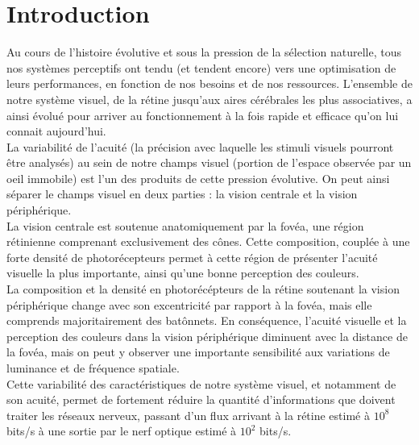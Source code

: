 
\chapter{Introduction} %
\label{Introduction} %


\newcommand{\keyword}[1]{\textbf{#1}}
\newcommand{\tabhead}[1]{\textbf{#1}}
\newcommand{\code}[1]{\texttt{#1}}
\newcommand{\file}[1]{\texttt{\bfseries#1}}
\newcommand{\option}[1]{\texttt{\itshape#1}}


Au cours de l'histoire évolutive et sous la pression de la sélection naturelle, tous nos systèmes perceptifs ont tendu (et tendent encore) vers une optimisation de leurs performances, en fonction de nos besoins et de nos ressources.
L'ensemble de notre système visuel, de la rétine jusqu'aux aires cérébrales les plus associatives, a ainsi évolué pour arriver au fonctionnement à la fois rapide et efficace qu'on lui connait aujourd'hui. \autocite{Werner2014}\\

La variabilité de l'acuité (la précision avec laquelle les stimuli visuels pourront être analysés) au sein de notre champs visuel (portion de l'espace observée par un oeil immobile) est l'un des produits de cette pression évolutive. On peut ainsi séparer le champs visuel en deux parties : la vision centrale et la vision périphérique.\autocite{Werner2014} \\
La vision centrale est soutenue anatomiquement par la fovéa, une région rétinienne comprenant exclusivement des cônes. Cette composition, couplée à une forte densité de photorécepteurs permet à cette région de présenter l'acuité visuelle la plus importante, ainsi qu'une bonne perception des couleurs. \autocite{Werner2014}\\
La composition et la densité en photorécépteurs de la rétine soutenant la vision périphérique change avec son excentricité par rapport à la fovéa, mais elle comprends majoritairement des batônnets. En conséquence, l'acuité visuelle et la perception des couleurs dans la vision périphérique diminuent avec la distance de la fovéa, mais on peut y observer une importante sensibilité aux variations de luminance et de fréquence spatiale. \autocite{Werner2014}\\%
Cette variabilité des caractéristiques de notre système visuel, et notamment de son acuité, permet de fortement réduire la quantité d'informations que doivent traiter les réseaux nerveux, passant d'un flux arrivant à la rétine estimé à $10^{8}$ bits/s à une sortie par le nerf optique estimé à $10^{2}$ bits/s. \autocite{Kortum1996, Werner2014, Zhaoping2014}\\

